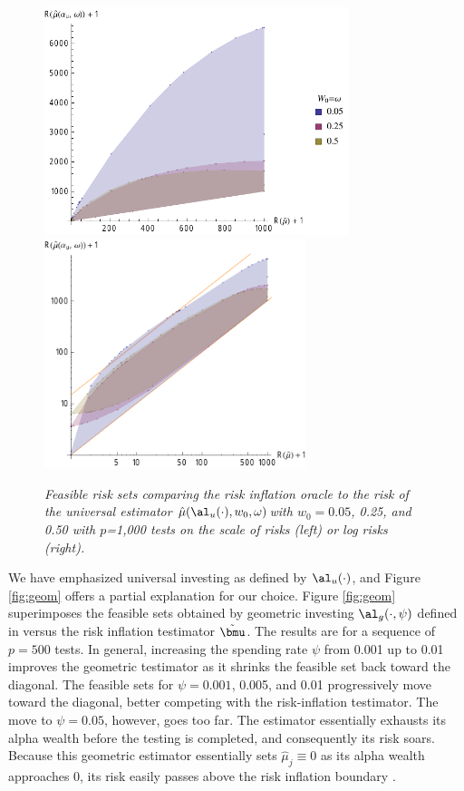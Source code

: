 \documentclass[12pt]{article}
\newcommand{\uTest}{\mbox{$\hat\mu(\al_u(\cdot),w_0,\omega)$}}
\begin{document}
\begin{figure}
 \caption{ \label{fig:univRI} {\sl Feasible risk sets comparing the risk
 inflation oracle to the risk of the universal estimator \uTest with $w_0=0.05$,
 0.25, and 0.50 with $p$=1,000 tests on the scale of risks (left) or log risks
 (right).}  }

 \vspace{0.1in}
 \centerline{
 \includegraphics[width=3.5in]{figures/univVsRI}
 \includegraphics[width=3.0in]{figures/univVsRILog}    }
 \vspace{0.2in}
\end{figure}


 We have emphasized universal investing as defined by $\al_u(\cdot)$, and Figure
 \ref{fig:geom} offers a partial explanation for our choice.  Figure
 \ref{fig:geom} superimposes the feasible sets obtained by geometric investing
 $\al_g(\cdot, \psi)$ defined in  versus the risk inflation
 testimator $\tilde{\bmu}$.  The results are for a sequence of $p = 500$ tests.
  In general, increasing the spending rate $\psi$ from 0.001 up to 0.01 improves
 the geometric testimator as it shrinks the feasible set back toward the
 diagonal.  The feasible sets for $\psi=0.001$, 0.005, and 0.01 progressively
 move toward the diagonal, better competing with the risk-inflation testimator.
  The move to $\psi = 0.05$, however, goes too far.  The estimator essentially
 exhausts its alpha wealth before the testing is completed, and consequently its
 risk soars.  Because this geometric estimator essentially sets $\hat\mu_j
 \equiv 0$ as its alpha wealth approaches 0, its risk easily passes above the
 risk inflation boundary .
\end{document}
